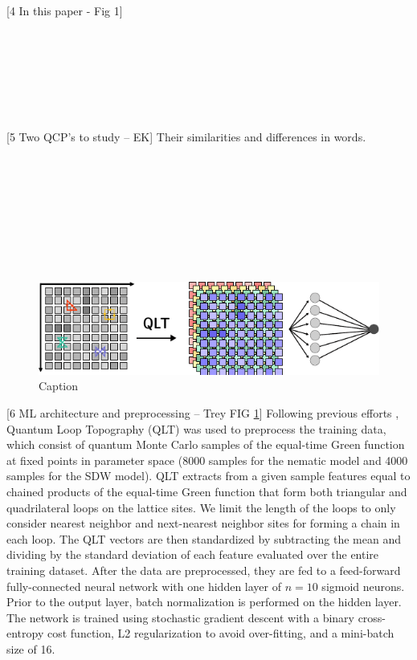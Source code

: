 \documentclass[amsmath,amssymb, aps, prx, longbibliography, twocolumn]{revtex4-1}
\begin{document}
[4 In this paper - Fig 1] 
\\
\\
\\
\\
\\
\\
\\
\\


[5 Two QCP's to study -- EK]
Their similarities and differences in words.
\\
\\
\\
\\
\\
\\
\\
\\
\\

 \begin{figure} [t]
    \centering
\includegraphics[width=.48\textwidth]{qlt.pdf}
    \caption{Caption}
    \label{fig:qlt}
\end{figure}
[6 ML architecture and preprocessing -- Trey FIG \ref{fig:qlt}]
Following previous efforts \cite{Zhang2019}, Quantum Loop Topography (QLT) was used to preprocess the training data, which consist of quantum Monte Carlo samples of the equal-time Green function at fixed points in parameter space (8000 samples for the nematic model and 4000 samples for the SDW model). QLT extracts from a given sample features equal to chained products of the equal-time Green function that form both triangular and quadrilateral loops on the lattice sites. We limit the length of the loops to only consider nearest neighbor and next-nearest neighbor sites for forming a chain in each loop. The QLT vectors are then standardized by subtracting the mean and dividing by the standard deviation of each feature evaluated over the entire training dataset. After the data are preprocessed, they are fed to a feed-forward fully-connected neural network with one hidden layer of $n=10$ sigmoid neurons. Prior to the output layer, batch normalization is performed on the hidden layer. The network is trained using stochastic gradient descent with a binary cross-entropy cost function, L2 regularization to avoid over-fitting, and a mini-batch size of 16. \\ 
\end{document}
